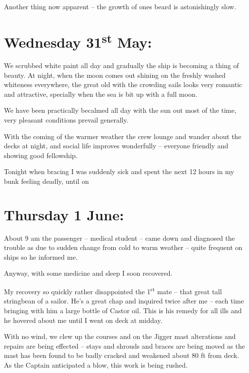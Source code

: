 \documentclass[
  11pt,
  msmallroyalvopaper
]{memoir}
\begin{document}
Another thing now apparent -- the growth of ones beard is astonishingly
slow.

\hypertarget{wednesday-31st-may}{%
\section{\texorpdfstring{Wednesday 31\textsuperscript{st}
May:}{Wednesday 31st May:}}\label{wednesday-31st-may}}

We scrubbed white paint all day and gradually the ship is becoming a
thing of beauty. At night, when the moon comes out shining on the
freshly washed whiteness everywhere, the great old with the crowding
sails looks very romantic and attractive, specially when the sea is bit
up with a full moon.

We have been practically becalmed all day with the sun out most of the
time, very pleasant conditions prevail generally.

With the coming of the warmer weather the crew lounge and wander about
the decks at night, and social life improves wonderfully -- everyone
friendly and showing good fellowship.

Tonight when bracing I was suddenly sick and spent the next 12 hours in
my bunk feeling deadly, until on

\hypertarget{thursday-1-june}{%
\section{Thursday 1 June:}\label{thursday-1-june}}

About 9 am the passenger -- medical student -- came down and diagnosed
the trouble as due to sudden change from cold to warm weather -- quite
frequent on ships so he informed me.

Anyway, with some medicine and sleep I soon recovered.

My recovery so quickly rather disappointed the 1\textsuperscript{st}
mate -- that great tall stringbean of a sailor. He's a great chap and
inquired twice after me -- each time bringing with him a large bottle of
Castor oil. This is his remedy for all ills and he hovered about me
until I went on deck at midday.

With no wind, we clew up the courses and on the Jigger mast alterations
and repairs are being effected -- stays and shrouds and braces are being
moved as the mast has been found to be badly cracked and weakened about
80 ft from deck. As the Captain anticipated a blow, this work is being
rushed.
\end{document}
